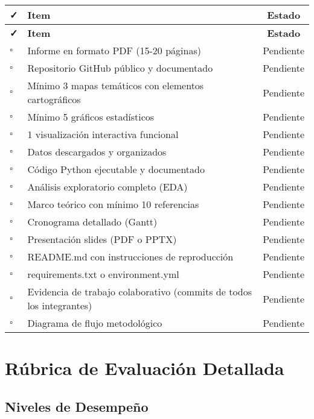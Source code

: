 \documentclass[11pt,letterpaper]{article}
\begin{document}
\begin{longtable}{|p{1cm}|p{10cm}|c|}
\hline
\rowcolor{usachblue!20}
\textbf{✓} & \textbf{Item} & \textbf{Estado} \\
\hline
\endfirsthead
\hline
\rowcolor{usachblue!20}
\textbf{✓} & \textbf{Item} & \textbf{Estado} \\
\hline
\endhead
$\square$ & Informe en formato PDF (15-20 páginas) & Pendiente \\
\hline
$\square$ & Repositorio GitHub público y documentado & Pendiente \\
\hline
$\square$ & Mínimo 3 mapas temáticos con elementos cartográficos & Pendiente \\
\hline
$\square$ & Mínimo 5 gráficos estadísticos & Pendiente \\
\hline
$\square$ & 1 visualización interactiva funcional & Pendiente \\
\hline
$\square$ & Datos descargados y organizados & Pendiente \\
\hline
$\square$ & Código Python ejecutable y documentado & Pendiente \\
\hline
$\square$ & Análisis exploratorio completo (EDA) & Pendiente \\
\hline
$\square$ & Marco teórico con mínimo 10 referencias & Pendiente \\
\hline
$\square$ & Cronograma detallado (Gantt) & Pendiente \\
\hline
$\square$ & Presentación slides (PDF o PPTX) & Pendiente \\
\hline
$\square$ & README.md con instrucciones de reproducción & Pendiente \\
\hline
$\square$ & requirements.txt o environment.yml & Pendiente \\
\hline
$\square$ & Evidencia de trabajo colaborativo (commits de todos los integrantes) & Pendiente \\
\hline
$\square$ & Diagrama de flujo metodológico & Pendiente \\
\hline
\end{longtable}

\section{Rúbrica de Evaluación Detallada}

\subsection{Niveles de Desempeño}
\end{document}
